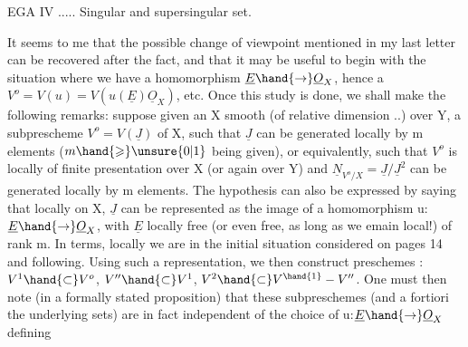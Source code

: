 
EGA IV ..... Singular and supersingular set.

It seems to me that the possible change of viewpoint mentioned in my
last letter can be recovered after the fact, and that it may be useful
to begin with the situation where we have a homomorphism $\underline{E}\hand{\to}\underline{O}_X$, hence
a $V^o = V(u) = V(u(\underline{E})\underline{O}_X)$, etc. Once this study is done, we shall make the
following remarks: suppose given an X smooth (of relative dimension  ..)
over Y, a subprescheme $V^o = V(\underline{J})$ of X, such that $\underline{J}$ can be generated
locally  by m elements ($m\hand{\geqslant}\unsure{0|1}$ being given), or equivalently,
such that $V^o$ is locally of finite presentation over X (or again over
Y) and  $\underline{N}_{V^o/X} = \underline{J}/\underline{J}^2$ can be generated locally by m elements. The
hypothesis can also be expressed by saying that locally on X, $\underline{J}$ can be
represented as the image of a homomorphism u: $\underline{E}\hand{\to}\underline{O}_X$, with $\underline{E}$ locally
free (or even free, as long as we emain local!) of rank m. In 
terms, locally we are in the initial situation considered on
pages 14 and following. Using such a representation, we then construct
preschemes : $V^1 \hand{\subset} V^o$, $V'' \hand{\subset} V^1$, $V^2 \hand{\subset} V^{\hand{1}}-V''$. One must then note
(in a formally stated proposition) that these subpreschemes (and a fortiori the underlying
sets) are in fact independent of the choice of u:$\underline{E}\hand{\to}\underline{O}_X$ defining
